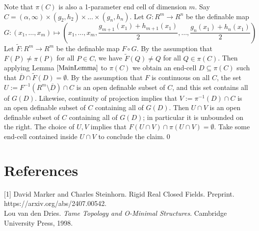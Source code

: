 \documentclass{article}
\newtheorem{theorem}{Theorem}[section]
\theoremstyle{remark}
\theoremstyle{definition}
\theoremstyle{definition}
\theoremstyle{definition}
\theoremstyle{definition}
\begin{document}
    Note that $\pi(C)$ is also a 1-parameter end cell of dimension $m$. Say $C=(\alpha,\infty)\times (g_2,h_2)\times\dots\times(g_n,h_n)$. Let $G:R^m\to R^n$ be the definable map \[G:(x_1,\dots,x_m)\mapsto (x_1, \dots,x_m,\frac{g_{m+1}(x_1)+h_{m+1}(x_1)}{2},\dots,\frac{g_n(x_1)+h_n(x_1)}{2})\]
    Let $\tilde{F}:R^m\to R^m$ be the definable map $F\circ G$. By the assumption that $F(P)\neq \pi(P)$ for all $P\in C$, we have $\tilde{F}(Q)\neq Q$ for all $Q\in \pi(C)$. Then applying Lemma $\ref{MainLemma}$ to $\pi(C)$ we obtain an end-cell $D\subseteq \pi(C)$ such that $\overline{D}\cap \tilde{F}(D)=\emptyset$. By the assumption that $F$ is continuous on all $C$, the set $U:=F^{-1}(R^m\setminus \overline{D})\cap C$ is an open definable subset of $C$, and this set contains all of $G(D)$. Likewise, continuity of projection implies that $V:=\pi^{-1}(D)\cap C$ is an open definable subset of $C$ containing all of $G(D)$. Then $U\cap V$ is an open definable subset of $C$ containing all of $G(D)$; in particular it is unbounded on the right. The choice of $U,V$ implies that $F(U\cap V)\cap \pi(U\cap V)=\emptyset$. Take some end-cell contained inside $U\cap V$ to conclude the claim.\qed

\section{References}
[1] David Marker and Charles Steinhorn. Rigid Real Closed Fields. Preprint. https://arxiv.org/abs/2407.00542.
\\

\noindent[2] 
  Lou van den Dries. \textit{Tame Topology and O-Minimal Structures}. Cambridge University Press, 1998.





    
\end{document}
